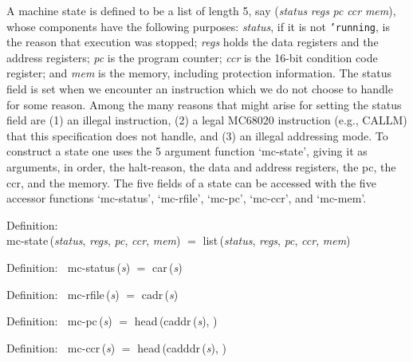  A machine state is defined to be a list of length 5, say ({\it{status\/}} {\it{regs\/}} {\it{pc\/}} {\it{ccr\/}}
 {\it{mem\/}}), whose components have the following purposes: {\it{status\/}}, if it is not
 {\tt{'}}{\tt{running}}, is the reason that execution was stopped; {\it{regs\/}} holds the data
 registers and the address registers; {\it{pc\/}} is the program counter; {\it{ccr\/}} is the
 16-bit condition code register; and {\it{mem\/}} is the memory, including protection information.
 The status field is
 set when we encounter an instruction which we do not choose to handle for
 some reason.  Among the many reasons that might arise for setting the
 status field are (1) an illegal instruction, (2) a legal MC68020 instruction (e.g., CALLM)
 that this specification does not handle, and (3) an illegal addressing mode.  To construct a
 state one uses the 5 argument function `mc-state', giving it as arguments, in
 order, the halt-reason, the data and address registers, the pc, the ccr, and
 the memory.  The five fields of a state can be accessed with the five
 accessor functions `mc-status', `mc-rfile', `mc-pc', `mc-ccr', and `mc-mem'.

\begin{tabbing}{\sc Definition}: \\  
{\rm{mc-state}}\,({\it{status\/}}, {\it{regs\/}}, {\it{pc\/}}, {\it{ccr\/}}, {\it{mem\/}}) $=$ {\rm{list}}\,({\it{status\/}}, {\it{regs\/}}, {\it{pc\/}}, {\it{ccr\/}}, {\it{mem\/}})
\end{tabbing}

\begin{tabbing}{\sc Definition}:$\;\;$
{\rm{mc-status}}\,({\it{s\/}}) $=$ {\rm{car}}\,({\it{s\/}})
\end{tabbing}

\begin{tabbing}{\sc Definition}:$\;\;$
{\rm{mc-rfile}}\,({\it{s\/}}) $=$ {\rm{cadr}}\,({\it{s\/}})
\end{tabbing}

\begin{tabbing}{\sc Definition}:$\;\;$
{\rm{mc-pc}}\,({\it{s\/}}) $=$ {\rm{head}}\,({\rm{caddr}}\,({\it{s\/}}), {})
\end{tabbing}

\begin{tabbing}{\sc Definition}:$\;\;$
{\rm{mc-ccr}}\,({\it{s\/}}) $=$ {\rm{head}}\,({\rm{cadddr}}\,({\it{s\/}}), {})
\end{tabbing}

